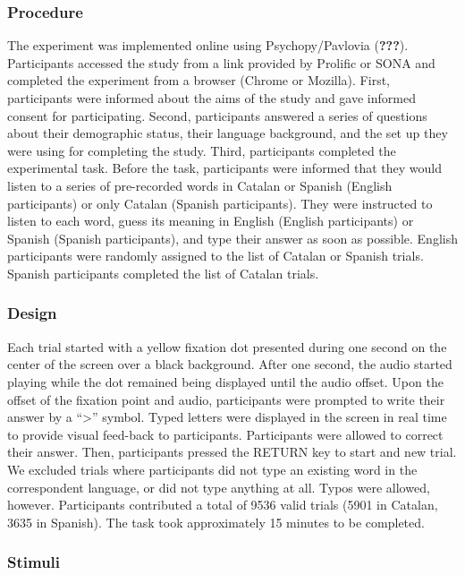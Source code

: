 \documentclass[
  english,
  man]{apa6}
\begin{document}
\hypertarget{procedure}{%
\subsubsection{Procedure}\label{procedure}}

The experiment was implemented online using Psychopy/Pavlovia ({\textbf{???}}). Participants accessed the study from a link provided by Prolific or SONA and completed the experiment from a browser (Chrome or Mozilla). First, participants were informed about the aims of the study and gave informed consent for participating. Second, participants answered a series of questions about their demographic status, their language background, and the set up they were using for completing the study. Third, participants completed the experimental task. Before the task, participants were informed that they would listen to a series of pre-recorded words in Catalan or Spanish (English participants) or only Catalan (Spanish participants). They were instructed to listen to each word, guess its meaning in English (English participants) or Spanish (Spanish participants), and type their answer as soon as possible. English participants were randomly assigned to the list of Catalan or Spanish trials. Spanish participants completed the list of Catalan trials.

\hypertarget{design}{%
\subsubsection{Design}\label{design}}

Each trial started with a yellow fixation dot presented during one second on the center of the screen over a black background. After one second, the audio started playing while the dot remained being displayed until the audio offset. Upon the offset of the fixation point and audio, participants were prompted to write their answer by a \enquote{\textgreater{}} symbol. Typed letters were displayed in the screen in real time to provide visual feed-back to participants. Participants were allowed to correct their answer. Then, participants pressed the RETURN key to start and new trial. We excluded trials where participants did not type an existing word in the correspondent language, or did not type anything at all. Typos were allowed, however. Participants contributed a total of 9536 valid trials (5901 in Catalan, 3635 in Spanish). The task took approximately 15 minutes to be completed.

\hypertarget{stimuli}{%
\subsubsection{Stimuli}\label{stimuli}}
\end{document}
